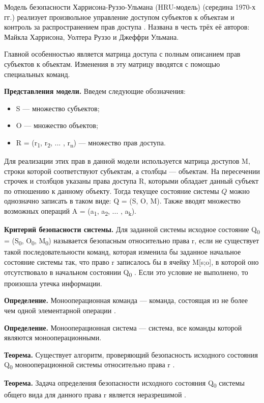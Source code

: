 Модель безопасности Харрисона-Руззо-Ульмана (HRU-модель) (середина 1970-х гг.) реализует произвольное управление
доступом субъектов к объектам и контроль за распространением прав доступа \autocite{Zegzhda}. Названа в честь
трёх её авторов: Майкла Харрисона, Уолтера Руззо и Джеффри Ульмана.

Главной особенностью является матрица доступа с полным описанием прав субъектов к объектам. Изменения в эту
матрицу вводятся с помощью специальных команд.

\textbf{Представления модели.} Введем следующие обозначения:
\begin{itemize}
    \item S --- множество субъектов;
    \item O --- множество объектов;
    \item R = (r\textsubscript{1}, r\textsubscript{2}, ... , r\textsubscript{n}) --- множество прав доступа.
\end{itemize}
Для реализации этих прав в данной модели используется матрица доступов M, строки которой соответствуют субъектам,
а столбцы --- объектам. На пересечении строчек и столбцов указаны права доступа R, которыми обладает данный субъект
по отношению к данному объекту. Тогда текущее состояние системы $Q$ можно однозначно записать в таком виде:
Q = (S, O, M). Также вводят множество возможных операций A = (a\textsubscript{1}, a\textsubscript{2}, ... , a\textsubscript{k}).

\textbf{Критерий безопасности системы.} Для заданной системы исходное состояние Q\textsubscript{0} = (S\textsubscript{0},
O\textsubscript{0}, M\textsubscript{0}) называется безопасным относительно права r, если не существует такой
последовательности команд, которая изменила бы заданное начальное состояние системы так, что право r записалось бы в
ячейку M[s;o], в которой оно отсутствовало в начальном состоянии Q\textsubscript{0} \autocite{Zegzhda}. Если это условие не выполнено,
то произошла утечка информации.

\textbf{Определение.} Монооперационная команда --- команда, состоящая из не более чем одной элементарной операции \autocite{Zegzhda}.

\textbf{Определение.} Монооперационная система --- система, все команды которой являются монооперационными.

\textbf{Теорема.} Существует алгоритм, проверяющий безопасность исходного состояния Q\textsubscript{0}
монооперационной системы относительно права r \autocite{WikiHRU}.

\textbf{Теорема.} Задача определения безопасности исходного состояния Q\textsubscript{0} системы общего вида для
данного права r является неразрешимой \autocite{WikiHRU}.

